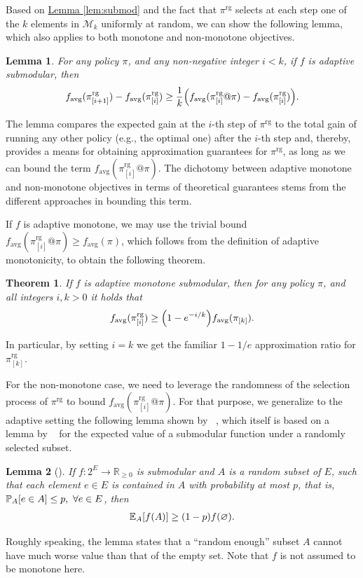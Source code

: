 \documentclass{article}
\newcommand{\lemmaref}[1]{\hyperref[#1]{Lemma \ref*{#1}}}
\newtheorem{theorem}{Theorem}
\newtheorem{lemma}{Lemma}
\let\originalleft\left
\let\originalright\right
\renewcommand{\left}{\mathopen{}\mathclose\bgroup\originalleft}
\renewcommand{\right}{\aftergroup\egroup\originalright}
\newcommand{\pik}{\pi_{[k]}}
\newcommand{\pig}{\pi^{\textrm{rg}}}
\newcommand{\pigi}{\pi^{\textrm{rg}}_{[i]}}
\newcommand{\pigii}{\pi^{\textrm{rg}}_{[i+1]}}
\newcommand{\pigk}{\pi^{\textrm{rg}}_{[k]}}
\newcommand{\favg}{f_{\mathrm{avg}}}
\newcommand{\Mk}{\mathcal{M}_k}
\newcommand{\citet}[1]{\citeauthor{#1}~\shortcite{#1}}
\begin{document}
Based on \lemmaref{lem:submod} and the fact that $\pig$ selects at each step one of the $k$ elements in $\Mk$ uniformly at random, we can show the following lemma, which also applies to both monotone and non-monotone objectives.
\begin{lemma}\label{lem:mon_main}
  For any policy $\pi$, and any non-negative integer $i < k$, if $f$ is adaptive submodular, then
  \begin{align*}
    \favg(\pigii) - \favg(\pigi) \geq \frac{1}{k}\left(\favg(\pigi @ \pi) - \favg(\pigi)\right).
  \end{align*}
\end{lemma}
\noindent The lemma compares the expected gain at the $i$-th step of $\pig$ to the total gain of running any other policy (e.g., the optimal one) after the $i$-th step and, thereby, provides a means for obtaining approximation guarantees for $\pig$, as long as we can bound the term $\favg(\pigi @ \pi)$.
The dichotomy between adaptive monotone and non-monotone objectives in terms of theoretical guarantees stems from the different approaches in bounding this term.

If $f$ is adaptive monotone, we may use the trivial bound $\favg(\pigi @ \pi) \geq \favg(\pi)$, which follows from the definition of adaptive monotonicity, to obtain the following theorem.
\begin{theorem}
  If $f$ is adaptive monotone submodular, then for any policy $\pi$, and all integers $i, k > 0$ it holds that
  \begin{align*}
    \favg(\pigi) \geq \left(1 - e^{-i/k}\right)\favg(\pik).
  \end{align*}
\end{theorem}
\noindent In particular, by setting $i = k$ we get the familiar $1-1/e$ approximation ratio for $\pigk$.

For the non-monotone case, we need to leverage the randomness of the selection process of $\pig$ to bound $\favg(\pigi @ \pi)$.
For that purpose, we generalize to the adaptive setting the following lemma shown by \citet{buchbinder14}, which itself is based on a lemma by \citet{feige07} for the expected value of a submodular function under a randomly selected subset.
\begin{lemma}[\cite{buchbinder14}]
  If $f : 2^E \to \mathbb{R}_{\geq 0}$ is submodular and $A$ is a random subset of $E$, such that each element $e \in E$ is contained in $A$ with probability at most $p$, that is, $\P[A]{e \in A} \leq p,\ \forall e \in E$, then
  \begin{align*}
    \E[A]{f(A)} \geq (1-p)f(\varnothing).
  \end{align*}
\end{lemma}
\noindent Roughly speaking, the lemma states that a ``random enough'' subset $A$ cannot have much worse value than that of the empty set.
Note that $f$ is not assumed to be monotone here.
\end{document}
